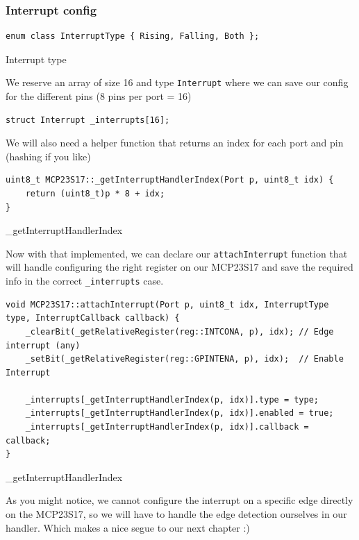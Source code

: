 \documentclass{article}
\begin{document}
\subsubsection{Interrupt config}

\begin{listing}[H]
\begin{verbatim}
enum class InterruptType { Rising, Falling, Both };
\end{verbatim}
\caption{Interrupt type}
\end{listing}

We reserve an array of size 16 and type \verb|Interrupt| where we can save our config for the different pins (8 pins per port = 16)

\begin{verbatim}
struct Interrupt _interrupts[16];
\end{verbatim}

We will also need a helper function that returns an index for each port and pin (hashing if you like)
\begin{listing}[H]
\begin{verbatim}
uint8_t MCP23S17::_getInterruptHandlerIndex(Port p, uint8_t idx) {
    return (uint8_t)p * 8 + idx;
}
\end{verbatim}
\caption{\_getInterruptHandlerIndex}
\end{listing}

Now with that implemented, we can declare our \verb|attachInterrupt| function that will handle configuring the right register on our MCP23S17 and save the required info in the correct \verb|_interrupts| case.
\begin{listing}[H]
\begin{verbatim}
void MCP23S17::attachInterrupt(Port p, uint8_t idx, InterruptType type, InterruptCallback callback) {
    _clearBit(_getRelativeRegister(reg::INTCONA, p), idx); // Edge interrupt (any)
    _setBit(_getRelativeRegister(reg::GPINTENA, p), idx);  // Enable Interrupt

    _interrupts[_getInterruptHandlerIndex(p, idx)].type = type;
    _interrupts[_getInterruptHandlerIndex(p, idx)].enabled = true;
    _interrupts[_getInterruptHandlerIndex(p, idx)].callback = callback;
}
\end{verbatim}
\caption{\_getInterruptHandlerIndex}
\end{listing}

As you might notice, we cannot configure the interrupt on a specific edge directly on the MCP23S17, so we will have to handle the edge detection ourselves in our handler. Which makes a nice segue to our next chapter :)
\end{document}
